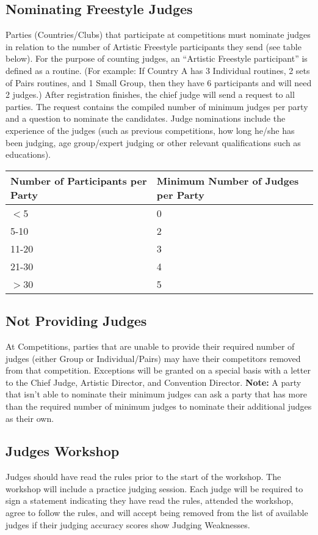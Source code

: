 \subsection{Nominating Freestyle Judges \label{subsec:freestyle_judging-panel_nominating-freestyle-judges}}
Parties (Countries/Clubs) that participate at competitions must nominate judges in relation to the number of Artistic Freestyle participants they send (see table below).
For the purpose of counting judges, an ``Artistic Freestyle participant'' is defined as a routine.
(For example: If Country A has 3 Individual routines, 2 sets of Pairs routines, and 1 Small Group, then they have 6 participants and will need 2 judges.)
After registration finishes, the chief judge will send a request to all parties.
The request contains the compiled number of minimum judges per party and a question to nominate the candidates.
Judge nominations include the experience of the judges (such as previous competitions, how long he/she has been judging, age group/expert judging or other relevant qualifications such as educations).

\begin{tabular}{|l|l|}
\hline
\textbf{Number of Participants per Party} & \textbf{Minimum Number of Judges per Party} \\
\hline
$<$5 & 0 \\
\hline
5-10 & 2 \\
\hline
11-20 & 3 \\
\hline
21-30 & 4 \\
\hline
$>$30 & 5 \\
\hline
\end{tabular}

\subsection{Not Providing Judges} %
At Competitions, parties that are unable to provide their required number of judges (either Group or Individual/Pairs) may have their competitors removed from that competition.
Exceptions will be granted on a special basis with a letter to the Chief Judge, Artistic Director, and Convention Director.
\textbf{Note:} A party that isn't able to nominate their minimum judges can ask a party that has more than the required number of minimum judges to nominate their additional judges as their own.

\subsection{Judges Workshop}
Judges should have read the rules prior to the start of the workshop.
The workshop will include a practice judging session.
Each judge will be required to sign a statement indicating they have read the rules, attended the workshop, agree to follow the rules, and will accept being removed from the list of available judges if their judging accuracy scores show Judging Weaknesses.%

